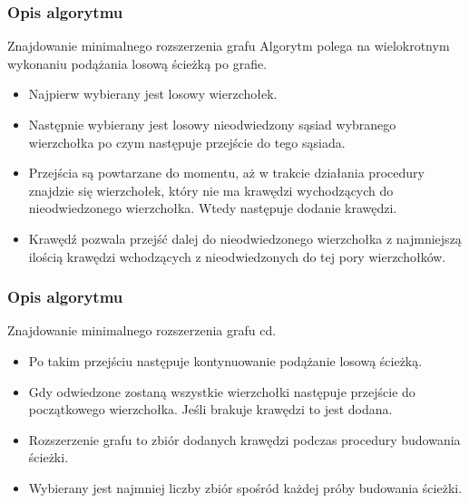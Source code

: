 \documentclass{beamer}
\begin{document}
\begin{frame}
\frametitle{Opis algorytmu}
\begin{block}{Znajdowanie minimalnego rozszerzenia grafu}
\justifying
Algorytm polega na wielokrotnym wykonaniu podążania losową ścieżką po grafie. \\ 
\begin{itemize}
    \item Najpierw wybierany jest losowy wierzchołek. \\ 
    \item Następnie wybierany jest losowy nieodwiedzony sąsiad wybranego wierzchołka po czym następuje przejście do tego sąsiada. \\ 
    \item Przejścia są powtarzane do momentu, aż w trakcie działania procedury znajdzie się wierzchołek, który nie ma krawędzi wychodzących do nieodwiedzonego wierzchołka. Wtedy następuje dodanie krawędzi. \\ 
    \item Krawędź pozwala przejść dalej do nieodwiedzonego wierzchołka z najmniejszą ilością krawędzi wchodzących z nieodwiedzonych do tej pory wierzchołków. \\ 
\end{itemize}
\end{block}
\end{frame}

\begin{frame}
\frametitle{Opis algorytmu}
\begin{block}{Znajdowanie minimalnego rozszerzenia grafu cd.}
\justifying
\begin{itemize}
    \item Po takim przejściu następuje kontynuowanie podążanie losową ścieżką. \\ 
    \item Gdy odwiedzone zostaną wszystkie wierzchołki następuje przejście do początkowego wierzchołka. Jeśli brakuje krawędzi to jest dodana. \\ 
    \item Rozszerzenie grafu to zbiór dodanych krawędzi podczas procedury budowania ścieżki. \\ 
    \item Wybierany jest najmniej liczby zbiór spośród każdej próby budowania ścieżki. \\
\end{itemize}
\end{block}
\end{frame}
\end{document}
